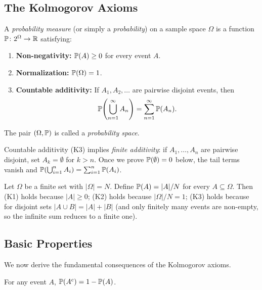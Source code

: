 \documentclass[11pt,a4paper]{article}
\begin{document}
\subsection{The Kolmogorov Axioms}

\begin{definition}
\label{def:kolmogorov}
A \emph{probability measure} (or simply a \emph{probability}) on a sample
space $\Omega$ is a function $\mathbb{P} \colon 2^\Omega \to \mathbb{R}$ satisfying:
\begin{enumerate}[nosep,label=(K\arabic*)]
    \item \textbf{Non-negativity:} $\mathbb{P}(A) \geq 0$ for every event $A$.
    \item \textbf{Normalization:} $\mathbb{P}(\Omega) = 1$.
    \item \textbf{Countable additivity:} If $A_1, A_2, \ldots$ are pairwise
    disjoint events, then
    \[
        \mathbb{P}\!\left(\bigcup_{n=1}^\infty A_n\right)
        = \sum_{n=1}^\infty \mathbb{P}(A_n).
    \]
\end{enumerate}
The pair $(\Omega, \mathbb{P})$ is called a \emph{probability space}.
\end{definition}

\begin{remark}
\label{rem:finite_additivity}
Countable additivity (K3) implies \emph{finite additivity}: if
$A_1, \ldots, A_n$ are pairwise disjoint, set $A_k = \emptyset$ for
$k > n$. Once we prove $\mathbb{P}(\emptyset) = 0$ below, the tail terms
vanish and $\mathbb{P}(\bigcup_{i=1}^n A_i) = \sum_{i=1}^n \mathbb{P}(A_i)$.
\end{remark}

\begin{example}
\label{ex:uniform}
Let $\Omega$ be a finite set with $|\Omega| = N$. Define
$\mathbb{P}(A) = |A|/N$ for every $A \subseteq \Omega$. Then (K1) holds
because $|A| \geq 0$; (K2) holds because $|\Omega|/N = 1$; (K3) holds
because for disjoint sets $|A \cup B| = |A| + |B|$ (and only finitely many
events are non-empty, so the infinite sum reduces to a finite one).
\end{example}

\subsection{Basic Properties}

We now derive the fundamental consequences of the Kolmogorov axioms.

\begin{proposition}
\label{prop:complement}
For any event $A$, $\mathbb{P}(A^c) = 1 - \mathbb{P}(A)$.
\end{proposition}
\end{document}
